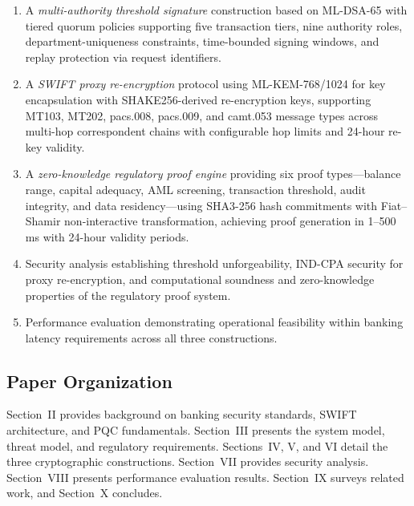 \documentclass[conference,10pt]{IEEEtran}
\begin{document}
\begin{enumerate}[leftmargin=*]
\item A \emph{multi-authority threshold signature} construction based on ML-DSA-65 with tiered quorum policies supporting five transaction tiers, nine authority roles, department-uniqueness constraints, time-bounded signing windows, and replay protection via request identifiers.

\item A \emph{SWIFT proxy re-encryption} protocol using ML-KEM-768/1024 for key encapsulation with SHAKE256-derived re-encryption keys, supporting MT103, MT202, pacs.008, pacs.009, and camt.053 message types across multi-hop correspondent chains with configurable hop limits and 24-hour re-key validity.

\item A \emph{zero-knowledge regulatory proof engine} providing six proof types---balance range, capital adequacy, AML screening, transaction threshold, audit integrity, and data residency---using SHA3-256 hash commitments with Fiat--Shamir non-interactive transformation, achieving proof generation in 1--500\,ms with 24-hour validity periods.

\item Security analysis establishing threshold unforgeability, IND-CPA security for proxy re-encryption, and computational soundness and zero-knowledge properties of the regulatory proof system.

\item Performance evaluation demonstrating operational feasibility within banking latency requirements across all three constructions.
\end{enumerate}

\subsection{Paper Organization}

Section~II provides background on banking security standards, SWIFT architecture, and PQC fundamentals. Section~III presents the system model, threat model, and regulatory requirements. Sections~IV, V, and VI detail the three cryptographic constructions. Section~VII provides security analysis. Section~VIII presents performance evaluation results. Section~IX surveys related work, and Section~X concludes.

\end{document}
